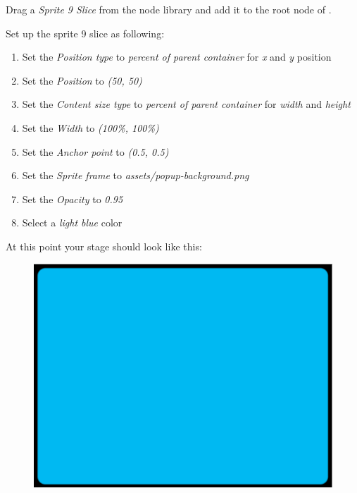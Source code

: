 \begin{leftbar}
Drag a \textit{Sprite 9 Slice} from the node library and add it to the root node
of .

Set up the sprite 9 slice as following:
\begin{enumerate}
  \item Set the \textit{Position type} to \textit{percent of parent
  container} for \textit{x} and \textit{y} position
  \item Set the \textit{Position} to \textit{(50, 50)}
  \item Set the \textit{Content size type} to \textit{percent of parent
  container} for
  \textit{width} and \textit{height}
  \item Set the \textit{Width} to \textit{(100\%, 100\%)} 
  \item Set the \textit{Anchor point} to \textit{(0.5, 0.5)}
  \item Set the \textit{Sprite frame} to \textit{assets/popup-background.png}
  \item Set the \textit{Opacity} to \textit{0.95}
  \item Select a \textit{light blue} color
\end{enumerate}
\end{leftbar} 

At this point your stage should look like this:
\begin{figure}[H]
    \centering
    \includegraphics[width=0.5\linewidth]{images/Chapter7/9_slice_setup.png}
\end{figure}

